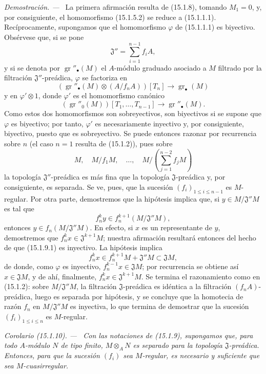 \documentclass[10pt,oneside]{book}
\makeatletter
\newcommand{\gr}{\operatorname{gr}}
\newcommand{\setmanualcurrentlabel}[1]{\def\@currentlabel{#1}}
\newcommand{\oldpage}[2][]{%
  \setcounter{footnote}{0}%
  \marginpar{\scriptsize\textbf{#1}~|~#2}\ignorespaces}
\newenvironment{corollary}[1][]{%
  \setmanualcurrentlabel{#1}\par\medskip\noindent\itshape Corolario (#1). ---\ }{\par}
\newenvironment{proof}{%
  \par\medskip\noindent\textit{Demostración. ---\ }}{\par}
\makeatother
\begin{document}
\begin{proof}
La primera afirmación resulta de (15.1.8), tomando $M_1=0$, y, por
consiguiente, el homomorfismo (15.1.5.2) se reduce a (15.1.1.1).
Recíprocamente, supongamos que el homomorfismo $\varphi$ de (15.1.1.1) es
biyectivo. Obsérvese que, si se pone
\[
  \mathfrak{J}''=\sum_{i=1}^{n-1}f_iA,
\]
\oldpage[0\textsubscript{IV-1}]{16}
y si se denota por $\gr''_\bullet(M)$ el $A$-módulo graduado asociado a $M$
filtrado por la filtración $\mathfrak{J}''$-preádica, $\varphi$ se factoriza en
\[
  (\gr''_\bullet(M)\otimes(A/f_nA))[T_n]\longrightarrow\gr_\bullet(M)
  \tag{15.1.9.1}\label{0.15.1.9.1-es}
\]
y en $\varphi'\otimes1$, donde $\varphi'$ es el homomorfismo canónico
\[
  (\gr''_0(M))[T_1,\ldots,T_{n-1}]
  \longrightarrow\gr''_\bullet(M).
\]
Como estos dos homomorfismos son sobreyectivos, son biyectivos si se supone que
$\varphi$ es biyectivo; por tanto, $\varphi'$ es necesariamente inyectivo y,
por consiguiente, biyectivo, puesto que es sobreyectivo. Se puede entonces
razonar por recurrencia sobre $n$ (el caso $n=1$ resulta de (15.1.2)), pues
sobre
\[
  M,\quad M/f_1M,\quad\ldots,\quad
  M/\left(\sum_{j=1}^{n-2}f_jM\right)
\]
la topología $\mathfrak{J}''$-preádica es más fina que la topología
$\mathfrak{J}$-preádica y, por consiguiente, es separada. Se ve, pues, que la
sucesión $(f_i)_{1\leq i\leq n-1}$ es $M$-regular. Por otra parte, demostremos
que la hipótesis implica que, si $y\in M/\mathfrak{J}''M$ es tal que
\[
  f_n^ky\in f_n^{k+1}(M/\mathfrak{J}''M),
\]
entonces $y\in f_n(M/\mathfrak{J}''M)$. En efecto, si $x$ es un representante
de $y$, demostremos que $f_n^kx\in\mathfrak{J}^{k+1}M$; nuestra afirmación
resultará entonces del hecho de que (15.1.9.1) es inyectivo. La hipótesis
implica
\[
  f_n^kx\in f_n^{k+1}M+\mathfrak{J}''M\subset\mathfrak{J}M,
\]
de donde, como $\varphi$ es inyectivo,
$f_n^{k-1}x\in\mathfrak JM$; por recurrencia se obtiene así
$x\in\mathfrak{J}M$, y de ahí, finalmente,
$f_n^kx\in\mathfrak{J}^{k+1}M$. Se termina el razonamiento como en
(15.1.2): sobre $M/\mathfrak{J}''M$, la filtración
$\mathfrak{J}$-preádica es idéntica a la filtración
$(f_nA)$-preádica, luego es separada por hipótesis, y se concluye que la
homotecia de razón $f_n$ en $M/\mathfrak{J}''M$ es inyectiva, lo que termina
de demostrar que la sucesión $(f_i)_{1\leq i\leq n}$ es $M$-regular.
\end{proof}

\begin{corollary}[15.1.10]
\label{0.15.1.10-es}
Con las notaciones de \textup{(15.1.9)}, supongamos que, para todo $A$-módulo $N$ de
tipo finito, $M\otimes_A N$ es separado para la topología
$\mathfrak{J}$-preádica. Entonces, para que la sucesión $(f_i)$ sea
$M$-regular, es necesario y suficiente que sea $M$-cuasirregular.
\end{corollary}
\end{document}
